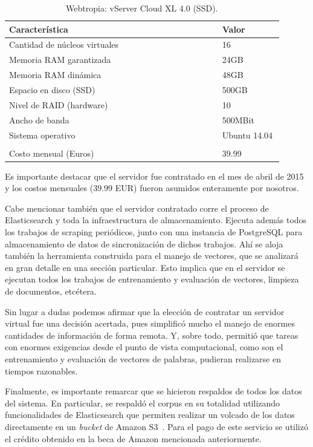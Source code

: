 \begin{table}[h]
    \centering
    \begin{tabular}{p{0.70\linewidth}p{0.20\linewidth}}
        \hline
        Característica & Valor\\
        \hline
        Cantidad de núcleos virtuales & 16\\
        Memoria RAM garantizada & 24GB\\
        Memoria RAM dinámica & 48GB\\
        Espacio en disco (SSD) & 500GB\\
        Nivel de RAID (hardware) & 10\\
        Ancho de banda & 500MBit\\
        Sistema operativo & Ubuntu 14.04\\
        \\
        Costo mensual (Euros) & 39.99\\
        \hline
    \end{tabular}
    \caption{Webtropia: vServer Cloud XL 4.0 (SSD).}
    \label{table:webtropia}
\end{table}

Es importante destacar que el servidor fue contratado en el mes de abril de 2015 y los costos mensuales
($39.99$ EUR) fueron asumidos enteramente por nosotros.

Cabe mencionar también que el servidor contratado corre el proceso de Elasticsearch y toda la
infraestructura de almacenamiento. Ejecuta además todos los trabajos de scraping periódicos, junto con
una instancia de PostgreSQL para almacenamiento de datos de sincronización de dichos trabajos. Ahí se
aloja también la herramienta construida para el manejo de vectores, que se analizará en gran detalle en
una sección particular. Esto implica que en el servidor se ejecutan todos los trabajos de entrenamiento y
evaluación de vectores, limpieza de documentos, etcétera.

Sin lugar a dudas podemos afirmar que la elección de contratar un servidor virtual fue una decisión
acertada, pues simplificó mucho el manejo de enormes cantidades de información de forma remota. Y, sobre
todo, permitió que tareas con enormes exigencias desde el punto de vista computacional, como son el
entrenamiento y evaluación de vectores de palabras, pudieran realizarse en tiempos razonables.

Finalmente, es importante remarcar que se hicieron respaldos de todos los datos del sistema. En particular,
se respaldó el corpus en su totalidad utilizando funcionalidades de Elasticsearch que permiten realizar
un volcado de los datos directamente en un \textit{bucket} de Amazon S3~\cite{AmazonS3}. Para el pago de
este servicio se utilizó el crédito obtenido en la beca de Amazon mencionada anteriormente.

